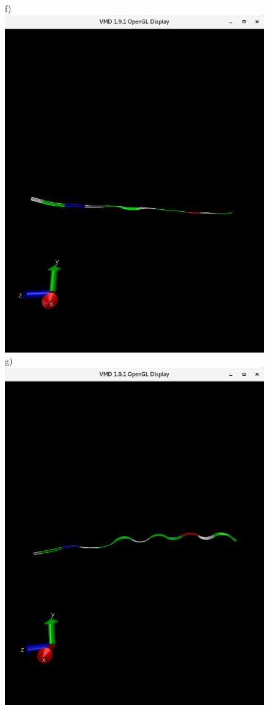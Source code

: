 \documentclass[12pt, onecolumn]{revtex4}    %
\begin{document}
\begin{figure}[h!]
f)\includegraphics[scale=0.15]{Last01}
g)\includegraphics[scale=0.15]{40_001}

\end{figure}
\end{document}

